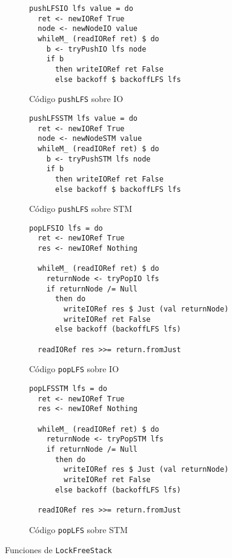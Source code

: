 \begin{figure}[t]
  \begin{subfigure}[b]{0.5\textwidth}
  \begin{verbatim}
pushLFSIO lfs value = do
  ret <- newIORef True
  node <- newNodeIO value
  whileM_ (readIORef ret) $ do
    b <- tryPushIO lfs node
    if b
      then writeIORef ret False
      else backoff $ backoffLFS lfs
  \end{verbatim}
  \caption{Código \texttt{pushLFS} sobre IO}
  \end{subfigure}
  \begin{subfigure}[b]{0.4\textwidth}
  \begin{verbatim}
pushLFSSTM lfs value = do
  ret <- newIORef True
  node <- newNodeSTM value
  whileM_ (readIORef ret) $ do
    b <- tryPushSTM lfs node
    if b
      then writeIORef ret False
      else backoff $ backoffLFS lfs
  \end{verbatim}
  \caption{Código \texttt{pushLFS} sobre STM}
  \end{subfigure}
\par\bigskip
  \begin{subfigure}[b]{0.5\textwidth}
  \begin{verbatim}
popLFSIO lfs = do
  ret <- newIORef True
  res <- newIORef Nothing

  whileM_ (readIORef ret) $ do
    returnNode <- tryPopIO lfs
    if returnNode /= Null
      then do
        writeIORef res $ Just (val returnNode)
        writeIORef ret False
      else backoff (backoffLFS lfs)

  readIORef res >>= return.fromJust
  \end{verbatim}
  \caption{Código \texttt{popLFS} sobre IO}
  \end{subfigure}
  \begin{subfigure}[b]{0.4\textwidth}
  \begin{verbatim}
popLFSSTM lfs = do
  ret <- newIORef True
  res <- newIORef Nothing

  whileM_ (readIORef ret) $ do
    returnNode <- tryPopSTM lfs
    if returnNode /= Null
      then do
        writeIORef res $ Just (val returnNode)
        writeIORef ret False
      else backoff (backoffLFS lfs)

  readIORef res >>= return.fromJust
  \end{verbatim}
  \caption{Código \texttt{popLFS} sobre STM}
  \end{subfigure}
  \caption{Funciones de \texttt{LockFreeStack}}
  \label{fig:lfs-push-pop}
\end{figure}

